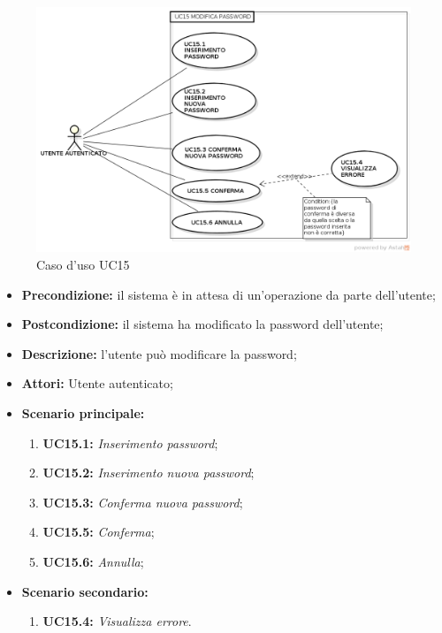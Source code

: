 \begin{figure}[H]
	\begin{center}
	\includegraphics[scale=0.4]{diagram/UC15.png}
	\caption{Caso d'uso UC15}
	\end{center}
\end{figure}
\begin{itemize}
	\item \textbf{Precondizione:} il sistema è in attesa di un'operazione da parte dell'utente;
	\item \textbf{Postcondizione:} il sistema ha modificato la password dell'utente;
	\item \textbf{Descrizione:} l'utente può modificare la password;
	\item \textbf{Attori:} Utente autenticato;
	\item \textbf{Scenario principale:}
	\begin{enumerate}
		\item \textbf{ UC15.1:} \textit{ Inserimento password};
		\item \textbf{ UC15.2:} \textit{ Inserimento nuova password};
		\item \textbf{ UC15.3:} \textit{ Conferma nuova password};
		\item \textbf{ UC15.5:} \textit{ Conferma};
		\item \textbf{ UC15.6:} \textit{ Annulla};
	\end{enumerate}
	\item \textbf{Scenario secondario:}
	\begin{enumerate}
		\item \textbf{ UC15.4:} \textit{ Visualizza errore}.
	\end{enumerate}
\end{itemize}
